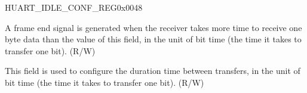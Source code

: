 \begin{register}{H}{UART\_IDLE\_CONF\_REG}{0x{}0048}\label{regdesc:UARTIDLECONFREG}
%
%
%
\regnewline%
\begin{regdesc}\begin{reglist}
\label{fielddesc:UARTRXIDLETHRHD}\item [UART\_RX\_IDLE\_THRHD] A frame end signal is generated when the receiver takes more time to receive one byte data than the value of this field, in the unit of bit time (the time it takes to transfer one bit). (R/W)
\label{fielddesc:UARTTXIDLENUM}\item [UART\_TX\_IDLE\_NUM] This field is used to configure the duration time between transfers, in the unit of bit time (the time it takes to transfer one bit). (R/W)
\end{reglist}\end{regdesc}
\end{register}


